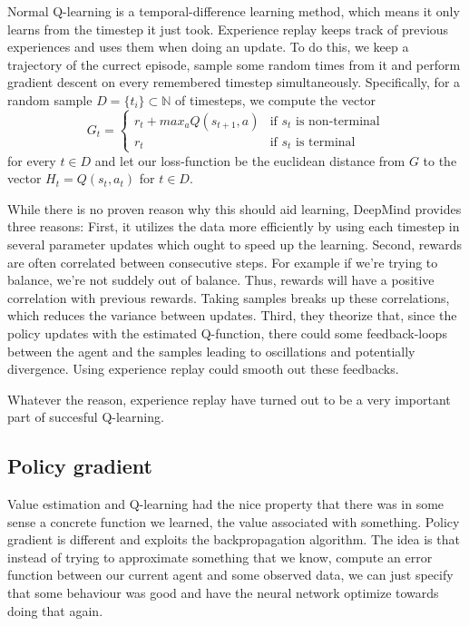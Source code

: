\documentclass{article}
\theoremstyle{changedot}
\theoremstyle{changedotbreak}
\theoremstyle{nonumberplain}
\begin{document}
Normal Q-learning is a temporal-difference learning method, which means it only learns from the timestep it just took. Experience replay keeps track of previous experiences and uses them when doing an update. To do this, we keep a trajectory of the currect episode, sample some random times from it and perform gradient descent on every remembered timestep simultaneously. Specifically, for a random sample $D = \{t_{i}\} \subset \mathbb N$ of timesteps, we compute the vector
\[G_{t} =  \begin{cases}
    r_{t} + max_{a} Q(s_{t+1}, a) & \text{if $s_{t}$ is non-terminal} \\
    r_{t} & \text{if $s_{t}$ is terminal}
  \end{cases} \]
for every $t \in D$ and let our loss-function be the euclidean distance from $G$ to the vector $H_{t} = Q(s_{t}, a_{t})$ for $t \in D$.

While there is no proven reason why this should aid learning, DeepMind provides three reasons: First, it utilizes the data more efficiently by using each timestep in several parameter updates which ought to speed up the learning. Second, rewards are often correlated between consecutive steps. For example if we're trying to balance, we're not suddely out of balance. Thus, rewards will have a positive correlation with previous rewards. Taking samples breaks up these correlations, which reduces the variance between updates. Third, they theorize that, since the policy updates with the estimated Q-function, there could some feedback-loops between the agent and the samples leading to oscillations and potentially divergence. Using experience replay could smooth out these feedbacks.

Whatever the reason, experience replay have turned out to be a very important part of succesful Q-learning.

\subsection{Policy gradient}
Value estimation and Q-learning had the nice property that there was in some sense a concrete function we learned, the value associated with something. Policy gradient is different and exploits the backpropagation algorithm. The idea is that instead of trying to approximate something that we know, compute an error function between our current agent and some observed data, we can just specify that some behaviour was good and have the neural network optimize towards doing that again.
\end{document}

